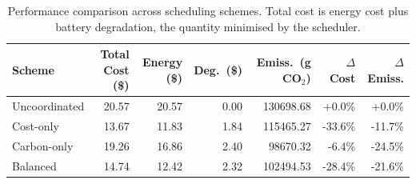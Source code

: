 \begin{table}[H]
\centering
\caption{Performance comparison across scheduling schemes. Total cost is energy cost plus battery degradation, the quantity minimised by the scheduler.}
\label{tab:performance}
\begin{tabular}{lrrrrrr}
\toprule
Scheme & Total Cost (\$) & Energy (\$) & Deg.\ (\$) & Emiss.\ (g CO$_2$) & $\Delta$Cost & $\Delta$Emiss. \\
\midrule
Uncoordinated & 20.57 & 20.57 & 0.00 & 130698.68 & +0.0\% & +0.0\% \\
Cost-only & 13.67 & 11.83 & 1.84 & 115465.27 & -33.6\% & -11.7\% \\
Carbon-only & 19.26 & 16.86 & 2.40 & 98670.32 & -6.4\% & -24.5\% \\
Balanced & 14.74 & 12.42 & 2.32 & 102494.53 & -28.4\% & -21.6\% \\
\bottomrule
\end{tabular}
\end{table}